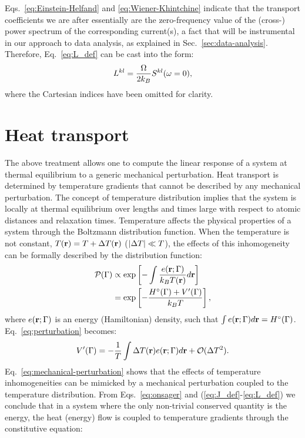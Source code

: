 Eqs.~\eqref{eq:Einstein-Helfand} and \eqref{eq:Wiener-Khintchine} indicate that the transport coefficients we are after essentially are the zero-frequency value of the (cross-) power spectrum of the corresponding current(s), a fact that will be instrumental in our approach to data analysis, as explained in Sec.~\ref{sec:data-analysis}. Therefore, Eq.~\eqref{eq:L_def} can be cast into the form:
\begin{equation}
    L^{kl} =\frac{\rOmega}{2 k_B} S^{kl}(\omega=0), \label{eq:GK-S0}
\end{equation}
where the Cartesian indices have been omitted for clarity.


\section{Heat transport}
The above treatment allows one to compute the linear response of a system at thermal equilibrium to a generic mechanical perturbation. Heat transport is determined by temperature gradients that cannot be described by any mechanical perturbation. The concept of temperature distribution implies that the system is locally at thermal equilibrium over lengths and times large with respect to atomic distances and relaxation times. Temperature affects the physical properties of a system through the Boltzmann distribution function. When the temperature is not constant, $T(\mathbf{r})=T+{\mathrm\Delta} T(\mathbf{r})$ ($|{\mathrm\Delta} T| \ll T$), the effects of this inhomogeneity can be formally described by the distribution function:
\begin{align}
  \mathcal{P}({\mathrm\Gamma}) & \propto
  \exp\left[ -\int \frac{e(\mathbf{r};{\mathrm\Gamma})}{k_BT(\mathbf{r})}d\mathbf{r} \right] \\
  &= \exp\left[ -\frac{H^\circ({\mathrm\Gamma})+V'({\mathrm\Gamma})}{k_BT} \right],
\end{align}
where $e(\mathbf{r};{\mathrm\Gamma})$ is an energy (Hamiltonian) density, such that $\int e(\mathbf{r};{\mathrm\Gamma}) d\mathbf{r} = H^\circ({\mathrm\Gamma})$. Eq.~\eqref{eq:perturbation} becomes:
\begin{equation}
   V'(\rGamma)=-\frac{1}{T}\int\rDelta T(\mathbf{r})e(\mathbf{r};\rGamma) d\mathbf{r} + \mathcal{O}(\rDelta T^2) . \label{eq:mechanical-perturbation}
\end{equation}
Eq.~\eqref{eq:mechanical-perturbation} shows that the effects of temperature inhomogeneities can be mimicked by a mechanical perturbation coupled to the temperature distribution. From Eqs.~\eqref{eq:onsager} and (\ref{eq:J_def}-\ref{eq:L_def}) we conclude that in a system where the only non-trivial conserved quantity is the energy, the heat (energy) flow is coupled to temperature gradients through the constitutive equation:
